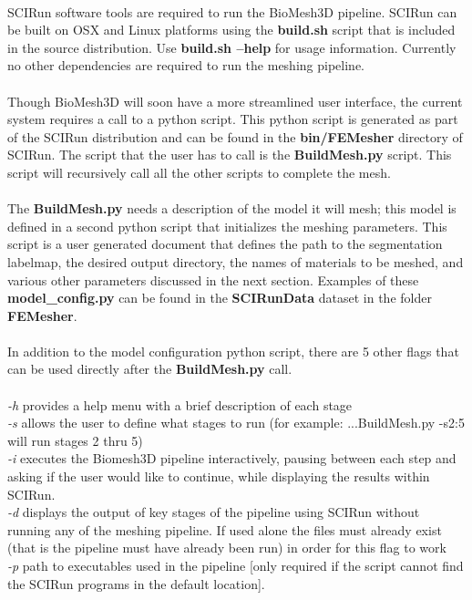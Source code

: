 \documentclass[fleqn,12pt,openany]{book}
\begin{document}
\paragraph{}
SCIRun software tools are required to run the BioMesh3D pipeline.
SCIRun can be built on OSX and Linux platforms using the {\bf build.sh} script that is included in the source distribution.
Use {\bf build.sh --help} for usage information.
Currently no other dependencies are required to run the meshing pipeline. 

\paragraph{}
Though BioMesh3D will soon have a more streamlined user interface, the current 
system requires a call to a python script. This python script is generated as 
part of the SCIRun distribution and can be found in the {\bf bin/FEMesher}
directory of SCIRun. The script that the user has to call is the {\bf BuildMesh.py }
script. This script will recursively call all the other scripts to complete the
mesh.

\paragraph{}
The {\bf BuildMesh.py} needs a description of the model it will mesh; this
model is defined in a second python script that initializes the meshing parameters.
This script is a user generated document that defines 
the path to the segmentation labelmap, the desired output directory, the names 
of materials to be meshed, and various other parameters discussed in the next section. 
Examples of these {\bf model\_config.py} can be found in the {\bf SCIRunData}
dataset in the folder {\bf FEMesher}.

\paragraph{}
In addition to the model configuration python script, there are 5 other flags 
that can be used directly after the {\bf BuildMesh.py} call. \\ \\
\emph{-h} provides a help menu with a brief description of each stage \\
\emph{-s} allows the user to define what stages to run (for example: ...BuildMesh.py -s2:5 will run stages 2 thru 5) \\
\emph{-i} executes the Biomesh3D pipeline interactively, pausing between each step and asking if the user would like to continue, while displaying the results within SCIRun. \\
\emph{-d} displays the output of key stages of the pipeline using SCIRun without running any of the meshing pipeline.  If used alone the files must already exist (that is the pipeline must have already been run) in order for this flag to work \\
\emph{-p} path to executables used in the pipeline [only required if the script cannot find the SCIRun programs in the default location].
\end{document}
